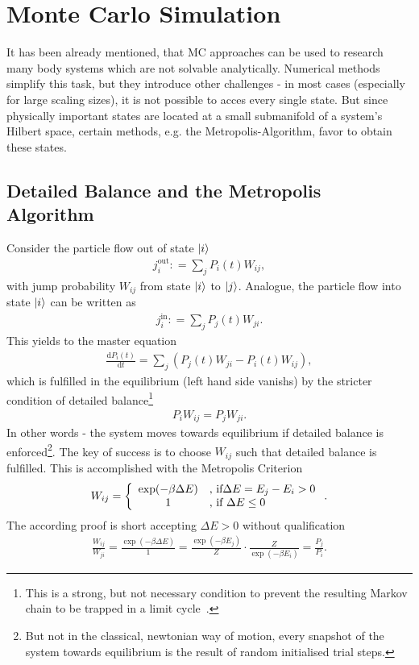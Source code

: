 \section{Monte Carlo Simulation}
It has been already mentioned, that MC approaches can be used to research many body systems which are not solvable analytically.
Numerical methods simplify this task, but they introduce other challenges - in most cases (especially for large scaling sizes), it is not possible to acces every single state.
But since physically important states are located at a small submanifold of a system's Hilbert space, certain methods, e.g. the Metropolis-Algorithm, favor to obtain these states.
\subsection*{Detailed Balance and the Metropolis Algorithm}
Consider the particle flow out of state $\ket{i}$
\begin{align}
	j^\text{out}_{i} \mathrel{\mathop:}= \sum_j P_i(t) W_{ij},
\end{align}
with jump probability $W_{ij}$ from state $\ket{i}$ to $\ket{j}$.
Analogue, the particle flow into state $\ket{i}$ can be written as
\begin{align}
	j^\text{in}_{i} \mathrel{\mathop:}= \sum_j P_j(t) W_{ji}.
\end{align}
This yields to the master equation
\begin{align}
	\frac{\mathrm{d}P_i(t)}{\mathrm{d}t} = 
		\sum_{j}\left(P_j(t)W_{ji} - P_i(t)W_{ij}\right),
\end{align}
which is fulfilled in the equilibrium (left hand side vanishs) by the stricter condition of detailed balance\footnote{This is a strong, but not necessary condition to prevent the resulting Markov chain to be trapped in a limit cycle~\cite{newman1999monte}.}
\begin{align}
	P_iW_{ij} = P_jW_{ji}.
\end{align}
In other words - the system moves towards equilibrium if detailed balance is enforced\footnote{But not in the classical, newtonian way of motion, every snapshot of the system towards equilibrium is the result of random initialised trial steps.}.
The key of success is to choose $W_{ij}$ such that detailed balance is fulfilled.
This is accomplished with the Metropolis Criterion
\begin{align}
	W_{ij} = \left\{
		\begin{array}{c l}
			\exp(-\beta\Delta E)&\text{, if}\Delta E = E_j - E_i > 0\\
			1										&\text{, if }\Delta E \leq 0 
		\end{array}\right..
\end{align}
The according proof is short accepting $\Delta E > 0$ without qualification
\begin{align} 
	\frac{W_{ij}}{W_{ji}} = \frac{\exp\left(-\beta\Delta E\right)}{1} = \frac{\exp(-\beta E_j)}{Z}\cdot\frac{Z}{\exp(-\beta E_i)} = \frac{P_j}{P_i}.
\end{align}

